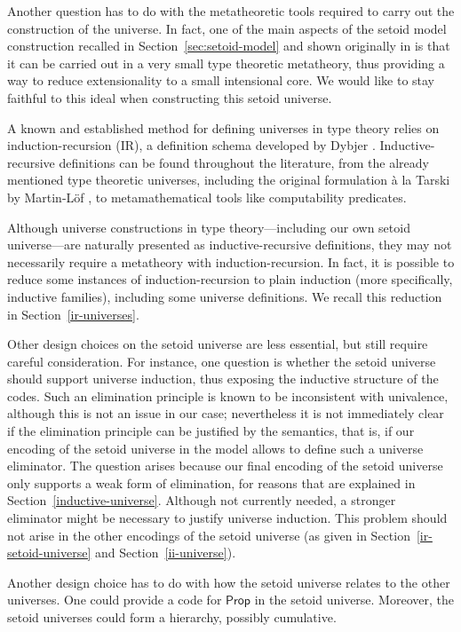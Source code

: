 \documentclass[autoref]{llncs}
\newcommand{\Prop}{\textsf{Prop}}
\begin{document}
Another question has to do with the metatheoretic tools required to carry out
the construction of the universe. In fact, one of the main aspects of the setoid
model construction recalled in Section~\ref{sec:setoid-model} and shown originally
in \cite{setoid99} is that it can be carried out in a very small type theoretic
metatheory, thus providing a way to reduce extensionality to a small intensional
core.
%
We would like to stay faithful to this ideal when constructing this setoid
universe.

A known and established method for defining universes in type theory relies on
induction-recursion (IR), a definition schema developed by Dybjer
\cite{ir-dybjer,dybjer-setzer}. Inductive-recursive definitions can be found
throughout the literature, from the already mentioned type theoretic universes,
including the original formulation \`{a} la Tarski by Martin-L\"of
\cite{libretto}, to metamathematical tools like computability predicates.

Although universe constructions in type theory---including our own setoid
universe---are naturally presented as inductive-recursive definitions, they may
not necessarily require a metatheory with induction-recursion. In fact, it is
possible to reduce some instances of induction-recursion to plain induction
(more specifically, inductive families), including some universe definitions. We
recall this reduction in Section~\ref{ir-universes}.

Other design choices on the setoid universe are less essential, but still
require careful consideration. For instance, one question is whether the setoid
universe should support universe induction, thus exposing the inductive
structure of the codes. Such an elimination principle is known to be inconsistent
with univalence, although this is not an issue in our case; nevertheless it is
not immediately clear if the elimination principle can be justified by the
semantics, that is, if our encoding of the setoid universe in the model allows
to define such a universe eliminator.
%
The question arises because our final encoding of the setoid universe only
supports a weak form of elimination, for reasons that are explained in
Section~\ref{inductive-universe}. Although not currently needed, a stronger
eliminator might be necessary to justify universe induction. This problem should
not arise in the other encodings of the setoid universe (as given in
Section~\ref{ir-setoid-universe} and Section~\ref{ii-universe}).

Another design choice has to do with how the setoid universe relates to the
other universes. One could provide a code for $\Prop$ in the setoid universe.
Moreover, the setoid universes could form a hierarchy, possibly
cumulative.
\end{document}
